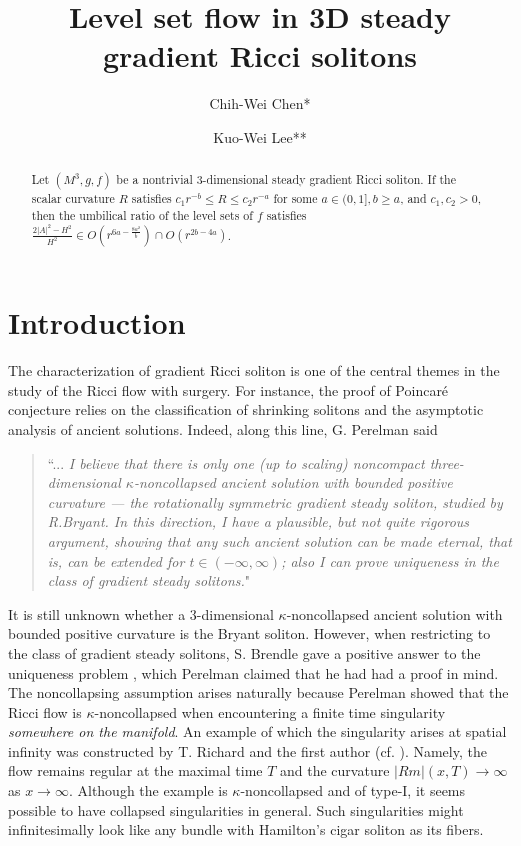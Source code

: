\documentclass[12pt,a4paper]{amsart}
\title[Level set flow in 3D steady gradient Ricci solitons]{Level set flow in 3D steady gradient Ricci solitons}
\author{Chih-Wei Chen*}
\author{Kuo-Wei Lee**}
\begin{document}
\maketitle
\begin{abstract}
Let $(M^3, g, f)$ be a nontrivial 3-dimensional steady gradient Ricci soliton.
If the scalar curvature $R$ satisfies
$c_1r^{-b}\leq R\leq c_2r^{-a}$ for some $a\in(0,1], b\geq a$,
and $c_1,c_2>0$, then the umbilical ratio of the level sets of $f$ satisfies $\frac{2|A|^2-H^2}{H^2}\in O(r^{6a-\frac{8a^2}{b}})\cap O(r^{2b-4a})$.
\end{abstract}
\section{Introduction}
The characterization of gradient Ricci soliton is one of the central themes in the study of the Ricci flow with surgery.
For instance, the proof of Poincar\'e conjecture relies on the classification of shrinking solitons
and the asymptotic analysis of ancient solutions.
Indeed, along this line, G. Perelman \cite{Perelman02} said

\begin{quote}
``... {\it I believe that there is only one (up to scaling) noncompact three-dimensional
$\kappa$-noncollapsed ancient solution with bounded positive curvature --- the rotationally symmetric gradient steady soliton,
studied by R.Bryant. In this direction, I have a plausible, but not quite rigorous argument, showing that any such ancient solution can be made eternal,
that is, can be extended for $t\in(-\infty,\infty)$; also I can prove uniqueness in the class of gradient steady solitons.}"
\end{quote}

It is still unknown whether a $3$-dimensional $\kappa$-noncollapsed ancient solution with bounded positive curvature is the Bryant soliton.
However, when restricting to the class of gradient steady solitons,
S. Brendle gave a positive answer to the uniqueness problem \cite{Brendle13}, which Perelman claimed that he had had a proof in mind.
The noncollapsing assumption arises naturally because Perelman showed that the Ricci flow is
$\kappa$-noncollapsed when encountering a finite time singularity {\it somewhere on the manifold}.
An example of which the singularity arises at spatial infinity was constructed by T. Richard and the first author (cf. \cite{ChenThesis}).
Namely, the flow remains regular at the maximal time $T$ and the curvature $|Rm|(x,T)\to\infty$ as $x\to\infty$.
Although the example is $\kappa$-noncollapsed and of type-I, it seems possible to have collapsed singularities in general.
Such singularities might infinitesimally look like any bundle with Hamilton's cigar soliton as its fibers.
\end{document}
